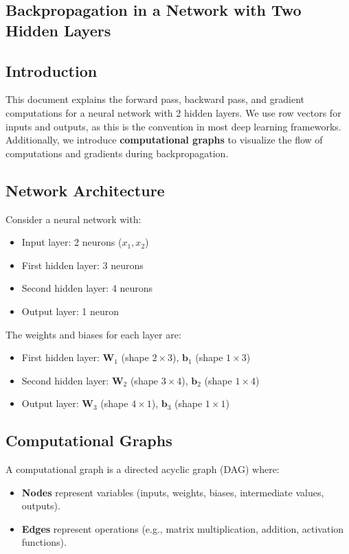 \begin{notechapter}
\chapter{Backpropagation in a Network with Two Hidden Layers}\label{ch:backprop-two-hidden}

\section{Introduction}
This document explains the forward pass, backward pass, and gradient
computations for a neural network with 2 hidden layers. We use row
vectors for inputs and outputs, as this is the convention in most deep
learning frameworks. Additionally, we introduce \textbf{computational
graphs} to visualize the flow of computations and gradients during
backpropagation.

\section{Network Architecture}
Consider a neural network with:
\begin{itemize}[leftmargin=*]
    \item Input layer: 2 neurons (\(x_1, x_2\))
    \item First hidden layer: 3 neurons
    \item Second hidden layer: 4 neurons
    \item Output layer: 1 neuron
\end{itemize}

The weights and biases for each layer are:
\begin{itemize}[leftmargin=*]
    \item First hidden layer: \(\bm{W}_1\) (shape \(2 \times 3\)),
    \(\bm{b}_1\) (shape \(1 \times 3\))
    \item Second hidden layer: \(\bm{W}_2\) (shape \(3 \times 4\)),
    \(\bm{b}_2\) (shape \(1 \times 4\))
    \item Output layer: \(\bm{W}_3\) (shape \(4 \times 1\)),
    \(\bm{b}_3\) (shape \(1 \times 1\))
\end{itemize}

\section{Computational Graphs}
A computational graph is a directed acyclic graph (DAG) where:
\begin{itemize}[leftmargin=*]
    \item \textbf{Nodes} represent variables (inputs, weights, biases,
    intermediate values, outputs).
    \item \textbf{Edges} represent operations (e.g., matrix
    multiplication, addition, activation functions).
\end{itemize}


\end{notechapter}

